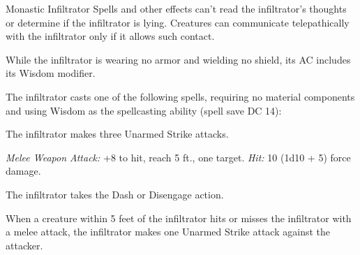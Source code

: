 \documentclass[10pt,a4paper,twoside,twocolumn,openany,nodeprecatedcode]{dndbook}
\begin{document}
\begin{DndMonster}[float=ht]{Monastic Infiltrator}
\DndMonsterBasics[
armor-class = {18 (Unarmored Defense)},
hit-points = {\DndDice{15d8 + 45}},
speed = {50 ft.}
]
\DndMonsterAbilityScores[
 str = 13,
 dex = 20,
 con = 16,
 int = 15,
 wis = 17,
 cha = 16
]
\DndMonsterDetails[
saving-throws = {Dex +8, Wis +6},
skills = {Acrobatics +8, Deception +9, Perception +6, Stealth +11},
damage-resistances = {psychic},
languages = {Common plus three other languages},
challenge = 6,
]
Spells and other effects can't read the infiltrator's thoughts or determine if the infiltrator is lying. Creatures can communicate telepathically with the infiltrator only if it allows such contact.

While the infiltrator is wearing no armor and wielding no shield, its AC includes its Wisdom modifier.

The infiltrator casts one of the following spells, requiring no material components and using Wisdom as the spellcasting ability (spell save DC 14):
\begin{DndMonsterSpells}
\end{DndMonsterSpells}
\par
{}
The infiltrator makes three Unarmed Strike attacks.

\textsl{Melee Weapon Attack:} +8 to hit, reach 5 ft., one target. \textsl{Hit:} 10 (1d10 + 5) force damage.

\par
{}
The infiltrator takes the Dash or Disengage action.

\par
{}
When a creature within 5 feet of the infiltrator hits or misses the infiltrator with a melee attack, the infiltrator makes one Unarmed Strike attack against the attacker.

\end{DndMonster}


\clearpage
{}
\end{document}
